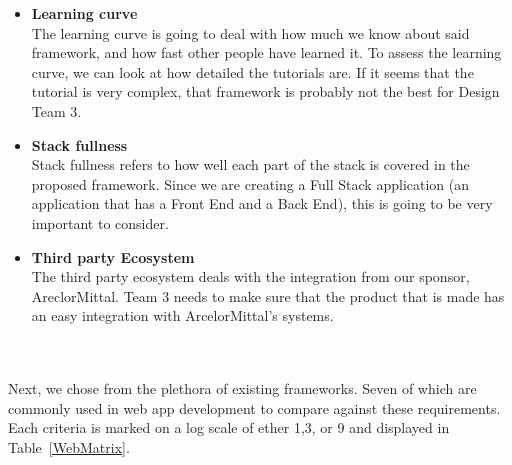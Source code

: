 \documentclass[Letter,11pt]{article}
\begin{document}
		\begin{minipage}[t]{0.5\textwidth}
		\begin{itemize}
			\item \textbf{Learning curve} \\
			The learning curve is going to deal with how much we know about said framework, and how fast other people have learned it. To assess the learning curve, we can look at how detailed the tutorials are. If it seems that the tutorial is very complex, that framework is probably not the best for Design Team 3. 


			\item \textbf{Stack fullness} \\
			Stack fullness refers to how well each part of the stack is covered in the proposed framework. Since we are creating a Full Stack application (an application that has a Front End and a Back End), this is going to be very important to consider.

			\item \textbf{Third party Ecosystem}\\
			The third party ecosystem deals with the integration from our sponsor, AreclorMittal. Team 3 needs to make sure that the product that is made has an easy integration with ArcelorMittal's systems. 
			
		\end{itemize}
		\end{minipage}\\
		\\

		Next, we chose from the plethora of existing frameworks. Seven of which are commonly used in web app development to compare against these requirements. Each criteria is marked on a log scale of ether 1,3, or 9 and displayed in Table~\ref{WebMatrix}.
		
\end{document}
